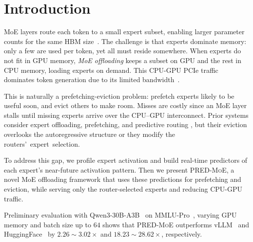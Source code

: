 \documentclass[sigconf]{acmart}
\newcommand{\sysname}{\textsc{PRED-MoE}\xspace}
\newcommand{\sys}{\sysname}
\begin{document}
\section{Introduction}

MoE layers route each token to a small expert subset, enabling larger parameter counts for the same HBM size~\cite{shazeer2017outrageously,fedus2022switch,jiang2024mixtral}. The challenge is that experts dominate memory: only a few are used per token, yet all must reside somewhere. When experts do not fit in GPU memory, \emph{MoE offloading} keeps a subset on GPU and the rest in CPU memory, loading experts on demand. This CPU-GPU PCIe traffic dominates token generation due to its limited bandwidth~\cite{nvidia_cuda_best_practices}.

This is naturally a prefetching-eviction problem: prefetch experts likely to be useful soon, and evict others to make room. Misses are costly since an MoE layer stalls until missing experts arrive over the CPU--GPU interconnect.
%
Prior systems consider expert offloading, prefetching, and predictive routing \cite{eliseev2023fast,du2024sida,he2026expertflow}, but their eviction overlooks the autoregressive structure or they modify the \mbox{routers' expert selection.}

To address this gap, we profile expert activation and build real-time predictors of each expert's near-future activation pattern. Then we present \sys, a novel MoE offloading framework that uses these predictions for prefetching and eviction, while serving only the router-selected experts and reducing CPU-GPU traffic.

Preliminary evaluation with Qwen3-30B-A3B~\cite{qwen2025qwen330ba3b} on MMLU-Pro~\cite{wang2024mmlupro}, varying GPU memory and batch size up to $64$ shows that \sysname outperforms vLLM~\cite{kwon2023vllm} and HuggingFace~\cite{wolf2019huggingface} by $2.26\sim 3.02\times$ and $18.23 \sim 28.62\times$, respectively.

\vspace{-2mm}
\end{document}
